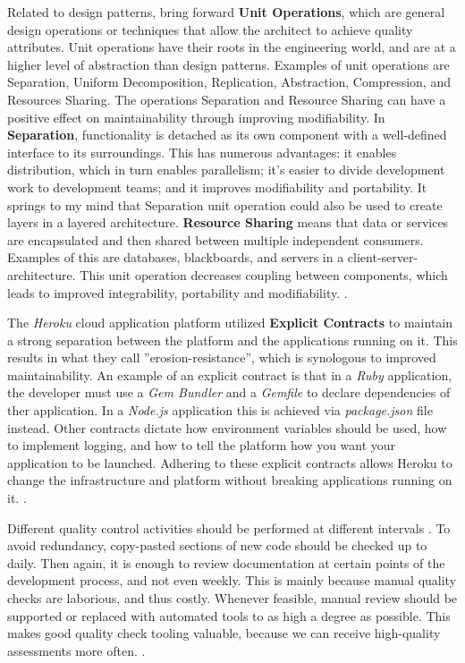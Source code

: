 \documentclass[utf8,english]{gradu3}
\begin{document}
Related to design patterns, \textcite{Bass1998} bring forward \textbf{Unit
  Operations}, which are general design operations or techniques that allow the
architect to achieve quality attributes. Unit operations have their roots in the
engineering world, and are at a higher level of abstraction than design
patterns. Examples of unit operations are Separation, Uniform Decomposition,
Replication, Abstraction, Compression, and Resources Sharing. The operations
Separation and Resource Sharing can have a positive effect on maintainability
through improving modifiability. In \textbf{Separation}, functionality is
detached as its own component with a well-defined interface to its surroundings.
This has numerous advantages: it enables distribution, which in turn enables
parallelism; it's easier to divide development work to development teams; and it
improves modifiability and portability. It springs to my mind that Separation
unit operation could also be used to create layers in a layered architecture.
\textbf{Resource Sharing} means that data or services are encapsulated and then
shared between multiple independent consumers. Examples of this are databases,
blackboards, and servers in a client-server-architecture. This unit operation
decreases coupling between components, which leads to improved integrability,
portability and modifiability. \parencite[123-126]{Bass1998}.

The \textit{Heroku} cloud application platform \parencite{Heroku2011} utilized
\textbf{Explicit Contracts} to maintain a strong separation between the platform
and the applications running on it. This results in what they call
''erosion-resistance'', which is synologous to improved maintainability. An
example of an explicit contract is that in a \textit{Ruby} application, the
developer must use a \textit{Gem Bundler} and a \textit{Gemfile} to declare
dependencies of ther application. In a \textit{Node.js} application this is
achieved via \textit{package.json} file instead. Other contracts dictate how
environment variables should be used, how to implement logging, and how to tell
the platform how you want your application to be launched. Adhering to these
explicit contracts allows Heroku to change the infrastructure and platform
without breaking applications running on it. \parencite{Heroku2011}.

Different quality control activities should be performed at different intervals
\parencite[25]{Broy2006}. To avoid redundancy, copy-pasted sections of new code
should be checked up to daily. Then again, it is enough to review documentation
at certain points of the development process, and not even weekly. This is
mainly because manual quality checks are laborious, and thus costly. Whenever
feasible, manual review should be supported or replaced with automated tools to
as high a degree as possible. This makes good quality check tooling valuable,
because we can receive high-quality assessments more often.
\parencite[25]{Broy2006}.
\end{document}
